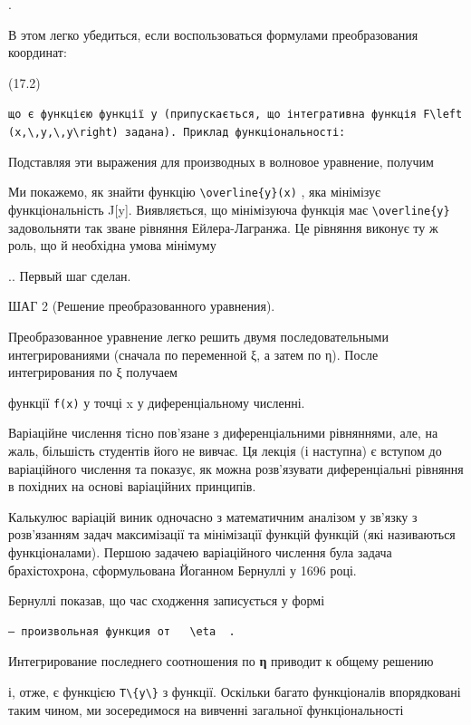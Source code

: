 \documentclass[
  ukrainian,
]{article}
\begin{document}
.

В этом легко убедиться, если воспользоваться формулами преобразования
координат:

(17.2)

\texttt{що\ є\ функцією\ функції\ y\ (припускається,\ що\ інтегративна\ функція\ \textquotesingle{}F\textbackslash{}left(x,\textbackslash{},y,\textbackslash{},y\textquotesingle{}\textbackslash{}right)\textquotesingle{}\ задана).\ Приклад\ функціональності:}

Подставляя эти выражения для производных в волновое уравнение, получим

Ми покажемо, як знайти функцію \texttt{\textbackslash{}overline\{y\}(x)}
, яка мінімізує функціональність J{[}y{]}. Виявляється, що мінімізуюча
функція має \texttt{\textbackslash{}overline\{y\}} задовольняти так
зване рівняння Ейлера-Лагранжа. Це рівняння виконує ту ж роль, що й
необхідна умова мінімуму

.. Первый шаг сделан.

ШАГ 2 (Решение преобразованного уравнения).

Преобразованное уравнение легко решить двумя последовательными
интегрированиями (сначала по переменной ξ, а затем по η). После
интегрирования по ξ получаем

функції \texttt{f(x)} у точці x у диференціальному численні.

Варіаційне числення тісно пов'язане з диференціальними рівняннями, але,
на жаль, більшість студентів його не вивчає. Ця лекція (і наступна) є
вступом до варіаційного числення та показує, як можна розв'язувати
диференціальні рівняння в похідних на основі варіаційних принципів.

Калькулюс варіацій виник одночасно з математичним аналізом у зв'язку з
розв'язанням задач максимізації та мінімізації функцій функцій (які
називаються функціоналами). Першою задачею варіаційного числення була
задача брахістохрона, сформульована Йоганном Бернуллі у 1696 році.

Бернуллі показав, що час сходження записується у формі

\begin{verbatim}
— произвольная функция от   \eta  .
\end{verbatim}

Интегрирование последнего соотношения по \textbf{η} приводит к общему
решению

і, отже, є функцією \texttt{T\textbackslash{}\{y\textbackslash{}\}} з
функції. Оскільки багато функціоналів впорядковані таким чином, ми
зосередимося на вивченні загальної функціональності
\end{document}
